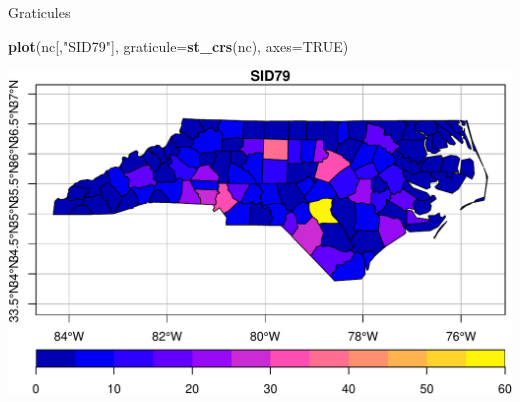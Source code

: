 \documentclass[11pt,ignorenonframetext,]{beamer}
\newenvironment{Shaded}{}{}
\newcommand{\DataTypeTok}[1]{\textcolor[rgb]{0.56,0.13,0.00}{#1}}
\newcommand{\KeywordTok}[1]{\textcolor[rgb]{0.00,0.44,0.13}{\textbf{#1}}}
\newcommand{\NormalTok}[1]{#1}
\newcommand{\OtherTok}[1]{\textcolor[rgb]{0.00,0.44,0.13}{#1}}
\newcommand{\StringTok}[1]{\textcolor[rgb]{0.25,0.44,0.63}{#1}}
\let\oldShaded\Shaded
\let\endoldShaded\endShaded
\renewenvironment{Shaded}{\footnotesize\begin{spacing}{0.9}\oldShaded}{\endoldShaded\end{spacing}}
\let\oldverbatim\verbatim
\let\endoldverbatim\endverbatim
\newcommand{\scriptoutput}{
  \renewenvironment{Shaded}{\scriptsize\begin{spacing}{0.9}\oldShaded}{\endoldShaded\end{spacing}}
  \renewenvironment{verbatim}{\scriptsize\begin{spacing}{0.9}\oldverbatim}{\endoldverbatim\end{spacing}}
}
\begin{document}
\begin{frame}[fragile,t]{Graticules}
\protect\hypertarget{graticules}{}

\scriptoutput

\begin{Shaded}
\begin{Highlighting}[]
\KeywordTok{plot}\NormalTok{(nc[,}\StringTok{"SID79"}\NormalTok{], }\DataTypeTok{graticule=}\KeywordTok{st_crs}\NormalTok{(nc), }\DataTypeTok{axes=}\OtherTok{TRUE}\NormalTok{)}
\end{Highlighting}
\end{Shaded}

\begin{center}\includegraphics[width=\textwidth]{Lec16_files/figure-beamer/unnamed-chunk-4-1} \end{center}

\end{frame}
\end{document}
